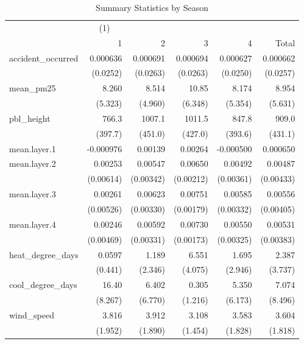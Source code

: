 \begin{table}[htbp]\centering
\caption{Summary Statistics by Season\label{sumstats\_season}}
\begin{tabular}{l*{5}{D{.}{.}{-1}}}
\toprule
                    &&            &            &            &            \\
                    &           1&           2&           3&           4&       Total\\
\midrule
accident\_occurred   &    0.000636&    0.000691&    0.000694&    0.000627&    0.000662\\
                    &    (0.0252)&    (0.0263)&    (0.0263)&    (0.0250)&    (0.0257)\\
\addlinespace
mean\_pm25           &       8.260&       8.514&       10.85&       8.174&       8.954\\
                    &     (5.323)&     (4.960)&     (6.348)&     (5.354)&     (5.631)\\
\addlinespace
pbl\_height          &       766.3&      1007.1&      1011.5&       847.8&       909.0\\
                    &     (397.7)&     (451.0)&     (427.0)&     (393.6)&     (431.1)\\
\addlinespace
mean.layer.1        &   -0.000976&     0.00139&     0.00264&   -0.000500&    0.000650\\
\addlinespace
mean.layer.2        &     0.00253&     0.00547&     0.00650&     0.00492&     0.00487\\
                    &   (0.00614)&   (0.00342)&   (0.00212)&   (0.00361)&   (0.00433)\\
\addlinespace
mean.layer.3        &     0.00261&     0.00623&     0.00751&     0.00585&     0.00556\\
                    &   (0.00526)&   (0.00330)&   (0.00179)&   (0.00332)&   (0.00405)\\
\addlinespace
mean.layer.4        &     0.00246&     0.00592&     0.00730&     0.00550&     0.00531\\
                    &   (0.00469)&   (0.00331)&   (0.00173)&   (0.00325)&   (0.00383)\\
\addlinespace
heat\_degree\_days    &      0.0597&       1.189&       6.551&       1.695&       2.387\\
                    &     (0.441)&     (2.346)&     (4.075)&     (2.946)&     (3.737)\\
\addlinespace
cool\_degree\_days    &       16.40&       6.402&       0.305&       5.350&       7.074\\
                    &     (8.267)&     (6.770)&     (1.216)&     (6.173)&     (8.496)\\
\addlinespace
wind\_speed          &       3.816&       3.912&       3.108&       3.583&       3.604\\
                    &     (1.952)&     (1.890)&     (1.454)&     (1.828)&     (1.818)\\
\bottomrule
\end{tabular}
\end{table}

